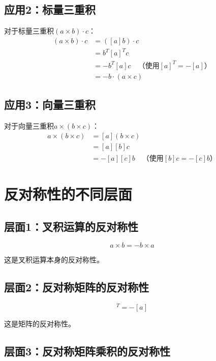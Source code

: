 \documentclass[12pt,a4paper]{article}
\begin{document}
\subsection{应用2：标量三重积}

对于标量三重积$(a \times b) \cdot c$：
\begin{align}
(a \times b) \cdot c &= ([a] b) \cdot c \\
&= b^T [a]^T c \\
&= -b^T [a] c \quad \text{（使用$[a]^T = -[a]$）} \\
&= -b \cdot (a \times c)
\end{align}

\subsection{应用3：向量三重积}

对于向量三重积$a \times (b \times c)$：
\begin{align}
a \times (b \times c) &= [a] (b \times c) \\
&= [a] [b] c \\
&= -[a] [c] b \quad \text{（使用$[b] c = -[c] b$）}
\end{align}

\section{反对称性的不同层面}

\subsection{层面1：叉积运算的反对称性}

\begin{equation}
a \times b = -b \times a
\end{equation}

这是叉积运算本身的反对称性。

\subsection{层面2：反对称矩阵的反对称性}

\begin{equation}
[a]^T = -[a]
\end{equation}

这是矩阵的反对称性。

\subsection{层面3：反对称矩阵乘积的反对称性}
\end{document}
